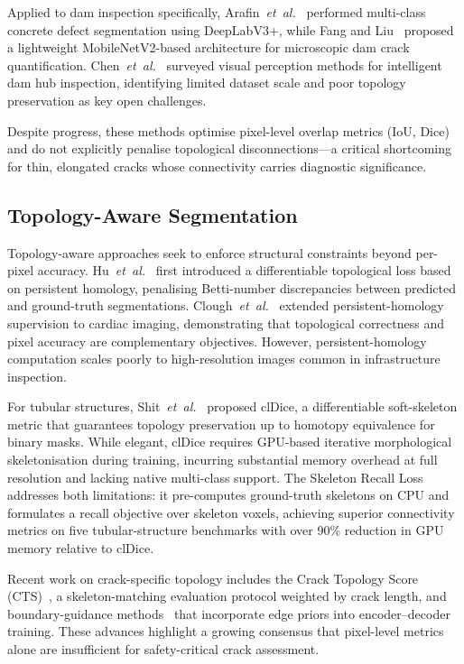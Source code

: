 Applied to dam inspection specifically, Arafin~\emph{et~al.}~\cite{arafin2024concrete} performed multi-class concrete defect segmentation using DeepLabV3+, while Fang and Liu~\cite{fang2024dam} proposed a lightweight MobileNetV2-based architecture for microscopic dam crack quantification.
Chen~\emph{et~al.}~\cite{chen2024damsurvey} surveyed visual perception methods for intelligent dam hub inspection, identifying limited dataset scale and poor topology preservation as key open challenges.

Despite progress, these methods optimise pixel-level overlap metrics (IoU, Dice) and do not explicitly penalise topological disconnections---a critical shortcoming for thin, elongated cracks whose connectivity carries diagnostic significance.

\subsection{Topology-Aware Segmentation}
\label{sec:related:topology}

Topology-aware approaches seek to enforce structural constraints beyond per-pixel accuracy.
Hu~\emph{et~al.}~\cite{hu2019topology} first introduced a differentiable topological loss based on persistent homology, penalising Betti-number discrepancies between predicted and ground-truth segmentations.
Clough~\emph{et~al.}~\cite{clough2020topological} extended persistent-homology supervision to cardiac imaging, demonstrating that topological correctness and pixel accuracy are complementary objectives.
However, persistent-homology computation scales poorly to high-resolution images common in infrastructure inspection.

For tubular structures, Shit~\emph{et~al.}~\cite{shit2021cldice} proposed clDice, a differentiable soft-skeleton metric that guarantees topology preservation up to homotopy equivalence for binary masks.
While elegant, clDice requires GPU-based iterative morphological skeletonisation during training, incurring substantial memory overhead at full resolution and lacking native multi-class support.
The Skeleton Recall Loss~\cite{shit2024skeleton} addresses both limitations: it pre-computes ground-truth skeletons on CPU and formulates a recall objective over skeleton voxels, achieving superior connectivity metrics on five tubular-structure benchmarks with over 90\% reduction in GPU memory relative to clDice.

Recent work on crack-specific topology includes the Crack Topology Score (CTS)~\cite{pantoja2024cracktopology}, a skeleton-matching evaluation protocol weighted by crack length, and boundary-guidance methods~\cite{wang2024dsctopology} that incorporate edge priors into encoder--decoder training.
These advances highlight a growing consensus that pixel-level metrics alone are insufficient for safety-critical crack assessment.

